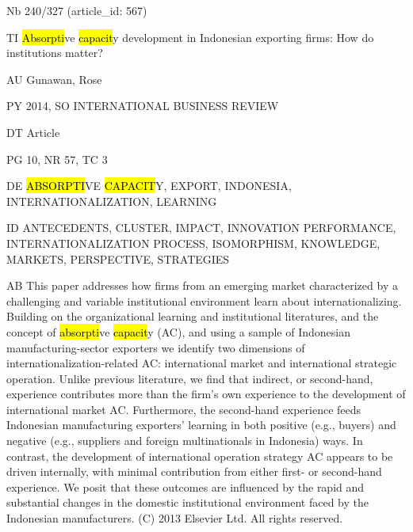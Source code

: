 \documentclass[a4paper]{article}
\begin{document}
\vspace*{-2cm}
Nb \tabto{0cm}240/327 (article\_id: 567)\par
TI \tabto{0cm}\hl{Absorpti}ve \hl{capacit}y development in Indonesian exporting firms: How do institutions matter?\par
AU \tabto{0cm}Gunawan, Rose\par
PY \tabto{0cm}2014, SO INTERNATIONAL BUSINESS REVIEW\par
DT \tabto{0cm}Article\par
PG \tabto{0cm}10, NR 57, TC 3\par
DE \tabto{0cm}\hl{ABSORPTI}VE \hl{CAPACIT}Y, EXPORT, INDONESIA, INTERNATIONALIZATION, LEARNING\par
ID \tabto{0cm}ANTECEDENTS, CLUSTER, IMPACT, INNOVATION PERFORMANCE, INTERNATIONALIZATION PROCESS, ISOMORPHISM, KNOWLEDGE, MARKETS, PERSPECTIVE, STRATEGIES\par
AB \tabto{0cm}This paper addresses how firms from an emerging market characterized by a challenging and variable institutional environment learn about internationalizing. Building on the organizational learning and institutional literatures, and the concept of \hl{absorpti}ve \hl{capacit}y (AC), and using a sample of Indonesian manufacturing-sector exporters we identify two dimensions of internationalization-related AC: international market and international strategic operation. Unlike previous literature, we find that indirect, or second-hand, experience contributes more than the firm's own experience to the development of international market AC. Furthermore, the second-hand experience feeds Indonesian manufacturing exporters' learning in both positive (e.g., buyers) and negative (e.g., suppliers and foreign multinationals in Indonesia) ways. In contrast, the development of international operation strategy AC appears to be driven internally, with minimal contribution from either first- or second-hand experience. We posit that these outcomes are influenced by the rapid and substantial changes in the domestic institutional environment faced by the Indonesian manufacturers. (C) 2013 Elsevier Ltd. All rights reserved.\par
\clearpage
\end{document}
